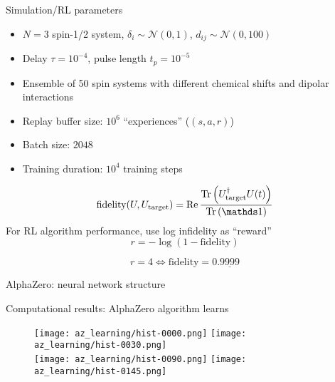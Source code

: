 \documentclass{beamer}
\begin{document}
%
%

\begin{frame}{Simulation/RL parameters}

\begin{itemize}
    \item $N=3$ spin-1/2 system, $\delta_i \sim \mathcal{N}(0, 1)$, $d_{ij} \sim \mathcal{N}(0, 100)$
    \item Delay $\tau = 10^{-4}$, pulse length $t_p = 10^{-5}$
    \item Ensemble of 50 spin systems with different chemical shifts and dipolar interactions
\end{itemize}


\begin{itemize}
    \item Replay buffer size: $10^6$ ``experiences'' ($(s, a, r)$)
    \item Batch size: $2048$
    \item Training duration: $10^4$ training steps
\end{itemize}

\[
    \text{fidelity}(U, U_\text{target}) = \Re{
        \frac{\Tr{U_\text{target}^\dagger U(t)}}{\Tr{\identity}}
    }
\]
For RL algorithm performance, use log infidelity as ``reward''
\[
    r = -\log \left( 1 - \text{fidelity} \right)
\]

\[
r = 4 \iff \text{fidelity} = 0.\underline{9999}
\]


\end{frame}

\begin{frame}{AlphaZero: neural network structure}

\begin{figure}
\centering
\scalebox{.6}{

}
\end{figure}

\end{frame}

\begin{frame}{Computational results: AlphaZero algorithm learns}

\begin{figure}
\centering
\texttt{[image: az\_learning/hist-0000.png]}
\texttt{[image: az\_learning/hist-0030.png]} \\
\texttt{[image: az\_learning/hist-0090.png]}
\texttt{[image: az\_learning/hist-0145.png]}
\end{figure}

\end{frame}
\end{document}
